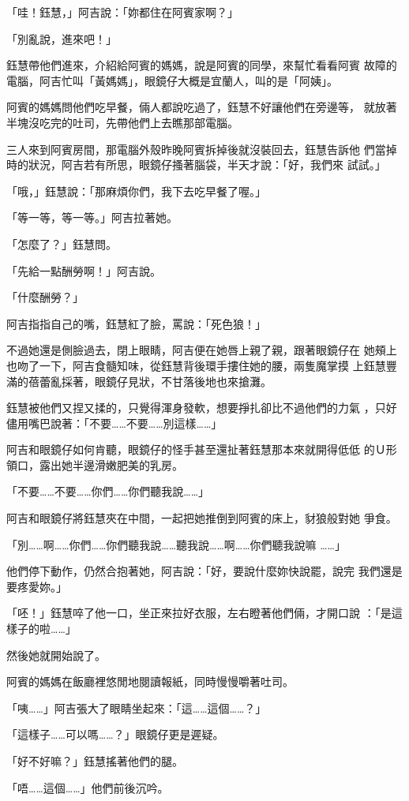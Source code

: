 「哇！鈺慧，」阿吉說：「妳都住在阿賓家啊？」

「別亂說，進來吧！」

鈺慧帶他們進來，介紹給阿賓的媽媽，說是阿賓的同學，來幫忙看看阿賓
故障的電腦，阿吉忙叫「黃媽媽」，眼鏡仔大概是宜蘭人，叫的是「阿姨」。

阿賓的媽媽問他們吃早餐，倆人都說吃過了，鈺慧不好讓他們在旁邊等，
就放著半塊沒吃完的吐司，先帶他們上去瞧那部電腦。

三人來到阿賓房間，那電腦外殼昨晚阿賓拆掉後就沒裝回去，鈺慧告訴他
們當掉時的狀況，阿吉若有所思，眼鏡仔搔著腦袋，半天才說：「好，我們來
試試。」

「哦，」鈺慧說：「那麻煩你們，我下去吃早餐了喔。」

「等一等，等一等。」阿吉拉著她。

「怎麼了？」鈺慧問。

「先給一點酬勞啊！」阿吉說。

「什麼酬勞？」

阿吉指指自己的嘴，鈺慧紅了臉，罵說：「死色狼！」

不過她還是側臉過去，閉上眼睛，阿吉便在她唇上親了親，跟著眼鏡仔在
她頰上也吻了一下，阿吉食髓知味，從鈺慧背後環手摟住她的腰，兩隻魔掌摸
上鈺慧豐滿的蓓蕾亂採著，眼鏡仔見狀，不甘落後地也來搶灘。

鈺慧被他們又捏又揉的，只覺得渾身發軟，想要掙扎卻比不過他們的力氣
，只好儘用嘴巴說著：「不要……不要……別這樣……」

阿吉和眼鏡仔如何肯聽，眼鏡仔的怪手甚至還扯著鈺慧那本來就開得低低
的Ｕ形領口，露出她半邊滑嫩肥美的乳房。

「不要……不要……你們……你們聽我說……」

阿吉和眼鏡仔將鈺慧夾在中間，一起把她推倒到阿賓的床上，豺狼般對她
爭食。

「別……啊……你們……你們聽我說……聽我說……啊……你們聽我說嘛
……」

他們停下動作，仍然合抱著她，阿吉說：「好，要說什麼妳快說罷，說完
我們還是要疼愛妳。」

「呸！」鈺慧啐了他一口，坐正來拉好衣服，左右瞪著他們倆，才開口說
：「是這樣子的啦……」

然後她就開始說了。

阿賓的媽媽在飯廳裡悠閒地閱讀報紙，同時慢慢嚼著吐司。

「咦……」阿吉張大了眼睛坐起來：「這……這個……？」

「這樣子……可以嗎……？」眼鏡仔更是遲疑。

「好不好嘛？」鈺慧搖著他們的腿。

「唔……這個……」他們前後沉吟。

